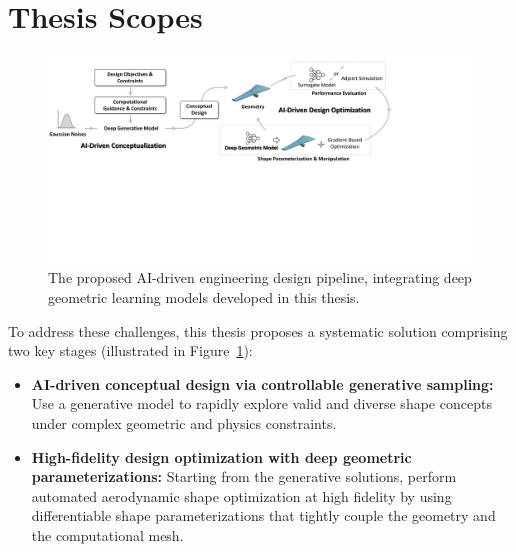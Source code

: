 \section{Thesis Scopes}
\label{ch1:sec:scopes}
\begin{figure}[tbh]
    \begin{center}
        \includegraphics[width=1\linewidth]{chapter1/fig/ai_framework.pdf}
    \end{center}
    \vspace{-3mm}
    \caption{
        \small The proposed AI-driven engineering design pipeline, integrating deep geometric learning models developed in this thesis.
    }
    \label{ch1:fig:ai_framework}
\end{figure}

To address these challenges, this thesis proposes a systematic solution comprising two key stages (illustrated in Figure~\ref{ch1:fig:ai_framework}): 
\begin{itemize}
    \item[1.] \textbf{AI-driven conceptual design via controllable generative sampling:} Use a generative model to rapidly explore valid and diverse shape concepts under complex geometric and physics constraints.
    \item[2.] \textbf{High-fidelity design optimization with deep geometric parameterizations:} Starting from the generative solutions, perform automated aerodynamic shape optimization at high fidelity by using differentiable shape parameterizations that tightly couple the geometry and the computational mesh.
\end{itemize}

